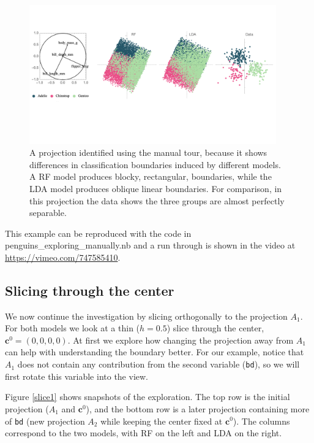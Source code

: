 \documentclass[]{interact}
\theoremstyle{plain}%
\theoremstyle{definition}
\theoremstyle{remark}
\begin{document}
\begin{figure}[ht]
\centerline{\includegraphics[width=0.95\textwidth]{figures/proj1.pdf}}
\caption{A projection identified using the manual tour, because it shows differences in classification boundaries induced by different models. A RF model produces blocky, rectangular, boundaries, while the LDA model produces oblique linear boundaries. For comparison, in this projection the data shows the three groups are almost perfectly separable.}
\label{proj1}
\end{figure}

This example can be reproduced with the code in
penguins\_exploring\_manually.nb and a run through is shown in the video
at \url{https://vimeo.com/747585410}.

\hypertarget{slicing-through-the-center}{%
\subsection{Slicing through the
center}\label{slicing-through-the-center}}

We now continue the investigation by slicing orthogonally to the
projection \(A_1\). For both models we look at a thin (\(h=0.5\)) slice
through the center, \(\mathbf{c}^0 = (0,0,0,0)\). At first we explore
how changing the projection away from \(A_1\) can help with
understanding the boundary better. For our example, notice that \(A_1\)
does not contain any contribution from the second variable
(\texttt{bd}), so we will first rotate this variable into the view.

Figure \ref{slice1} shows snapshots of the exploration. The top row is
the initial projection (\(A_1\) and \(\mathbf{c}^0\)), and the bottom
row is a later projection containing more of \texttt{bd} (new projection
\(A_2\) while keeping the center fixed at \(\mathbf{c}^0\)). The columns
correspond to the two models, with RF on the left and LDA on the right.
\end{document}
